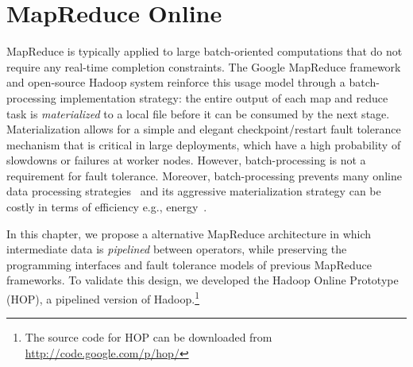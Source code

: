 \chapter[MapReduce Online]{MapReduce Online}
\label{ch:hop}

MapReduce is typically applied to large batch-oriented computations that do not
require any real-time completion constraints.  The Google MapReduce
framework~\cite{mapreduce-osdi} and open-source Hadoop system reinforce this
usage model through a batch-processing implementation strategy: the entire
output of each map and reduce task is {\em materialized} to a local file
before it can be consumed by the next stage.  Materialization allows for a
simple and elegant checkpoint/restart fault tolerance mechanism that is
critical in large deployments, which have a high probability of slowdowns or
failures at worker nodes.  However, batch-processing is not a requirement for
fault tolerance.  Moreover, batch-processing prevents many online data
processing strategies~\cite{onlineagg, borealis, stream, tcq-cidr} and its
aggressive materialization strategy can be costly in terms of efficiency e.g.,
energy~\cite{yanpei}.

In this chapter, we propose a alternative MapReduce architecture in which
intermediate data is {\em pipelined} between operators, while preserving the
programming interfaces and fault tolerance models of previous MapReduce
frameworks.  To validate this design, we developed the Hadoop Online Prototype
(HOP), a pipelined version of Hadoop.\footnote{The source code for HOP can be
downloaded from \url{http://code.google.com/p/hop/}}

